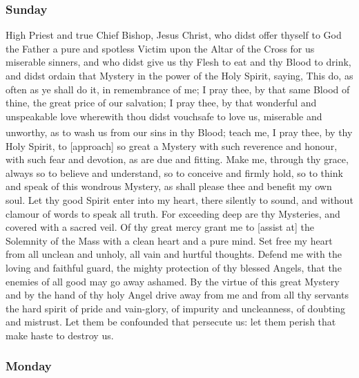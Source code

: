 \subsubsection{Sunday}
 High Priest and true Chief Bishop, Jesus Christ, who didst offer thyself to God the Father a pure and spotless Victim upon the Altar of the Cross for us miserable sinners, and who didst give us thy Flesh to eat and thy Blood to drink, and didst ordain that Mystery in the power of the Holy Spirit, saying, This do, as often as ye shall do it, in remembrance of me; I pray thee, by that same Blood of thine, the great price of our salvation; I pray thee, by that wonderful and unspeakable love wherewith thou didst vouchsafe to love us, miserable and unworthy, as to wash us from our sins in thy Blood;\textsuperscript{} teach me, I pray thee, by thy Holy Spirit, to [approach] so great a Mystery with such reverence and honour, with such fear and devotion, as are due and fitting. Make me, through thy grace, always so to believe and understand, so to conceive and firmly hold, so to think and speak of this wondrous Mystery, as shall please thee and benefit my own soul. Let thy good Spirit enter into my heart, there silently to sound, and without clamour of words to speak all truth. For exceeding deep are thy Mysteries, and covered with a sacred veil. Of thy great mercy grant me to [assist at] the Solemnity of the Mass with a clean heart and a pure mind. Set free my heart from all unclean and unholy, all vain and hurtful thoughts. Defend me with the loving and faithful guard, the mighty protection of thy blessed Angels, that the enemies of all good may go away ashamed. By the virtue of this great Mystery and by the hand of thy holy Angel drive away from me and from all thy servants the hard spirit of pride and vain-glory, of impurity and uncleanness, of doubting and mistrust. Let them be confounded that persecute us: let them perish that make haste to destroy us. 

\vspace{-0.25\baselineskip}

\subsubsection{Monday}

